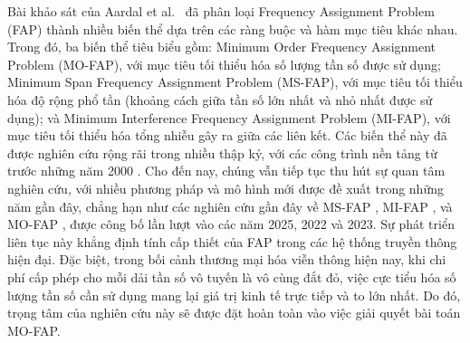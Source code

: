 \documentclass[letterpaper,journal]{IEEEtran}
\begin{document}
Bài khảo sát của Aardal et al.~\cite{Aardal2007} đã phân loại Frequency Assignment Problem (FAP) thành nhiều biến thể dựa trên các ràng buộc và hàm mục tiêu khác nhau. 
Trong đó, ba biến thể tiêu biểu gồm: Minimum Order Frequency Assignment Problem (MO-FAP), với mục tiêu tối thiểu hóa số lượng tần số được sử dụng; Minimum Span Frequency Assignment Problem (MS-FAP), với mục tiêu tối thiểu hóa độ rộng phổ tần (khoảng cách giữa tần số lớn nhất và nhỏ nhất được sử dụng); và Minimum Interference Frequency Assignment Problem (MI-FAP), với mục tiêu tối thiểu hóa tổng nhiễu gây ra giữa các liên kết. 
Các biến thể này đã được nghiên cứu rộng rãi trong nhiều thập kỷ, với các công trình nền tảng từ trước những năm 2000 \cite{Aardal2007}. Cho đến nay, chúng vẫn tiếp tục thu hút sự quan tâm nghiên cứu, với nhiều phương pháp và mô hình mới được đề xuất trong những năm gần đây, chẳng hạn như các nghiên cứu gần đây về MS-FAP \cite{Lee2025MS}, MI-FAP \cite{Ceschia2022MI}, và MO-FAP \cite{Gomez2023MO}, được công bố lần lượt vào các năm 2025, 2022 và 2023.
Sự phát triển liên tục này khẳng định tính cấp thiết của FAP trong các hệ thống truyền thông hiện đại.
Đặc biệt, trong bối cảnh thương mại hóa viễn thông hiện nay, khi chi phí cấp phép cho mỗi dải tần số vô tuyến là vô cùng đắt đỏ, việc cực tiểu hóa số lượng tần số cần sử dụng mang lại giá trị kinh tế trực tiếp và to lớn nhất. Do đó, trọng tâm của nghiên cứu này sẽ được đặt hoàn toàn vào việc giải quyết bài toán MO-FAP.
\end{document}

